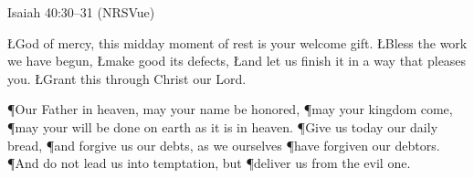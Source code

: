 \documentclass[11pt]{article}
\begin{document}



\begin{Psalm}{Isaiah 40:30--31 (NRSVue)}
\Indent{}
\Indent{}
\Indent{}
\end{Psalm}


\L{God of mercy, this midday moment of rest is your welcome gift.}
\L{Bless the work we have begun,}
\Indent\L{make good its defects,}
\Indent\L{and let us finish it in
a way that pleases you.}
\L{Grant this through Christ our Lord.}
\Amen







\P{Our Father in heaven, may your name be honored,}
\P{may your kingdom come,}
\P{may your will be done on earth as it is in heaven.}
\P{Give us today our daily bread,}
\P{and forgive us our debts, as we ourselves}
\Indent\P{have forgiven our debtors.}
\P{And do not lead us into temptation, but}
\Indent\P{deliver us from the evil one.}

\Amen
\end{document}
